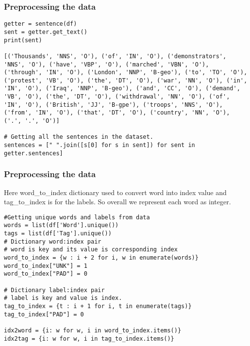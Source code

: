 \begin{frame}[fragile]\frametitle{Preprocessing the data}


\begin{lstlisting}
getter = sentence(df)
sent = getter.get_text()
print(sent)

[('Thousands', 'NNS', 'O'), ('of', 'IN', 'O'), ('demonstrators', 'NNS', 'O'), ('have', 'VBP', 'O'), ('marched', 'VBN', 'O'), ('through', 'IN', 'O'), ('London', 'NNP', 'B-geo'), ('to', 'TO', 'O'), ('protest', 'VB', 'O'), ('the', 'DT', 'O'), ('war', 'NN', 'O'), ('in', 'IN', 'O'), ('Iraq', 'NNP', 'B-geo'), ('and', 'CC', 'O'), ('demand', 'VB', 'O'), ('the', 'DT', 'O'), ('withdrawal', 'NN', 'O'), ('of', 'IN', 'O'), ('British', 'JJ', 'B-gpe'), ('troops', 'NNS', 'O'), ('from', 'IN', 'O'), ('that', 'DT', 'O'), ('country', 'NN', 'O'), ('.', '.', 'O')]

# Getting all the sentences in the dataset.
sentences = [" ".join([s[0] for s in sent]) for sent in getter.sentences]

\end{lstlisting}
\end{frame}

\begin{frame}[fragile]\frametitle{Preprocessing the data}
Here word\_to\_index dictionary used to convert word into index value and tag\_to\_index is for the labels. So overall we represent each word as integer.

\begin{lstlisting}
#Getting unique words and labels from data
words = list(df['Word'].unique())
tags = list(df['Tag'].unique())
# Dictionary word:index pair
# word is key and its value is corresponding index
word_to_index = {w : i + 2 for i, w in enumerate(words)}
word_to_index["UNK"] = 1
word_to_index["PAD"] = 0

# Dictionary label:index pair
# label is key and value is index.
tag_to_index = {t : i + 1 for i, t in enumerate(tags)}
tag_to_index["PAD"] = 0

idx2word = {i: w for w, i in word_to_index.items()}
idx2tag = {i: w for w, i in tag_to_index.items()}
\end{lstlisting}
\end{frame}

